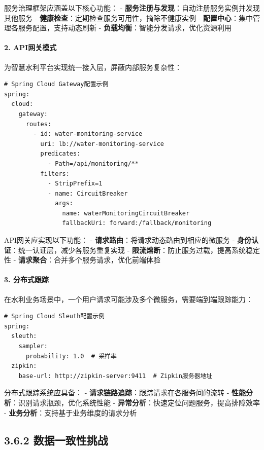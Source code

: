 服务治理框架应涵盖以下核心功能： -
\textbf{服务注册与发现}：自动注册服务实例并发现其他服务 -
\textbf{健康检查}：定期检查服务可用性，摘除不健康实例 -
\textbf{配置中心}：集中管理各服务配置，支持动态刷新 -
\textbf{负载均衡}：智能分发请求，优化资源利用

\paragraph{2. API网关模式}\label{apiux7f51ux5173ux6a21ux5f0f}

为智慧水利平台实现统一接入层，屏蔽内部服务复杂性：

\begin{lstlisting}
# Spring Cloud Gateway配置示例
spring:
  cloud:
    gateway:
      routes:
        - id: water-monitoring-service
          uri: lb://water-monitoring-service
          predicates:
            - Path=/api/monitoring/**
          filters:
            - StripPrefix=1
            - name: CircuitBreaker
              args:
                name: waterMonitoringCircuitBreaker
                fallbackUri: forward:/fallback/monitoring
\end{lstlisting}

API网关应实现以下功能： -
\textbf{请求路由}：将请求动态路由到相应的微服务 -
\textbf{身份认证}：统一认证层，减少各服务重复实现 -
\textbf{限流熔断}：防止服务过载，提高系统稳定性 -
\textbf{请求聚合}：合并多个服务请求，优化前端体验

\paragraph{3. 分布式跟踪}\label{ux5206ux5e03ux5f0fux8ddfux8e2a}

在水利业务场景中，一个用户请求可能涉及多个微服务，需要端到端跟踪能力：

\begin{lstlisting}
# Spring Cloud Sleuth配置示例
spring:
  sleuth:
    sampler:
      probability: 1.0  # 采样率
  zipkin:
    base-url: http://zipkin-server:9411  # Zipkin服务器地址
\end{lstlisting}

分布式跟踪系统应具备： - \textbf{请求链路追踪}：跟踪请求在各服务间的流转
- \textbf{性能分析}：识别请求瓶颈，优化系统性能 -
\textbf{异常分析}：快速定位问题服务，提高排障效率 -
\textbf{业务分析}：支持基于业务维度的请求分析

\subsection{3.6.2
数据一致性挑战}\label{ux6570ux636eux4e00ux81f4ux6027ux6311ux6218}


